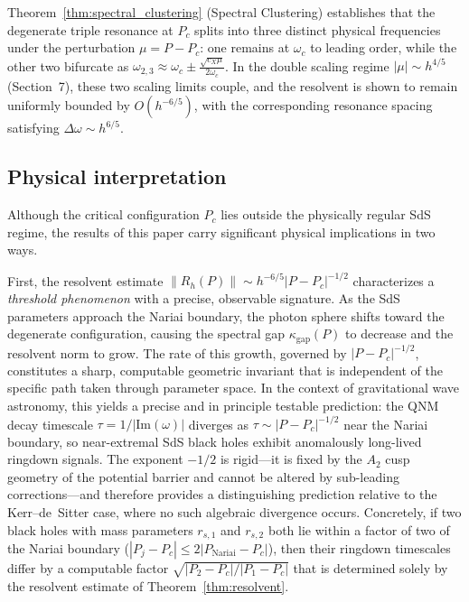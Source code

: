 \documentclass[12pt,a4paper]{amsart}
\theoremstyle{remark}
\begin{document}
Theorem~\ref{thm:spectral_clustering} (Spectral Clustering) establishes that the degenerate triple resonance at $P_c$
splits into three distinct physical frequencies under the perturbation $\mu = P-P_c$:
one remains at $\omega_c$ to leading order, while the other two bifurcate as
$\omega_{2,3} \approx \omega_c \pm \frac{\sqrt{c_X\mu}}{2\omega_c}$.
In the double scaling regime $|\mu| \sim h^{4/5}$ (Section~7), these two scaling limits couple,
and the resolvent is shown to remain uniformly bounded by $O(h^{-6/5})$, with the corresponding
resonance spacing satisfying $\Delta\omega \sim h^{6/5}$.

\subsection*{Physical interpretation}

Although the critical configuration $P_c$ lies outside the physically regular SdS regime, the results of this paper
carry significant physical implications in two ways.

First, the resolvent estimate $\|R_h(P)\| \sim h^{-6/5}|P-P_c|^{-1/2}$ characterizes
a \emph{threshold phenomenon} with a precise, observable signature. As the SdS parameters
approach the Nariai boundary, the photon sphere shifts toward the degenerate configuration,
causing the spectral gap $\kappa_{\mathrm{gap}}(P)$ to decrease and the resolvent norm to grow.
The rate of this growth, governed by $|P-P_c|^{-1/2}$, constitutes a sharp, computable
geometric invariant that is independent of the specific path taken through parameter space.
In the context of gravitational wave astronomy, this yields a precise and in principle
testable prediction: the QNM decay timescale $\tau = 1/|\mathrm{Im}(\omega)|$ diverges as
$\tau \sim |P - P_c|^{-1/2}$ near the Nariai boundary, so near-extremal SdS black holes
exhibit anomalously long-lived ringdown signals.
The exponent $-1/2$ is rigid---it is fixed by the $A_2$ cusp geometry of the potential
barrier and cannot be altered by sub-leading corrections---and therefore provides a
distinguishing prediction relative to the Kerr--de~Sitter case, where no such
algebraic divergence occurs.
Concretely, if two black holes with mass parameters $r_{s,1}$ and $r_{s,2}$ both lie
within a factor of two of the Nariai boundary
($|P_j - P_c| \leq 2|P_{\mathrm{Nariai}} - P_c|$), then their ringdown
timescales differ by a computable factor $\sqrt{|P_2-P_c|/|P_1-P_c|}$ that is
determined solely by the resolvent estimate of Theorem~\ref{thm:resolvent}.
\end{document}
